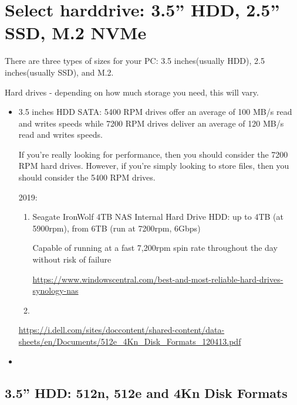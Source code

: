 \section{Select harddrive: 3.5'' HDD, 2.5'' SSD, M.2 NVMe}

There are three types of sizes for your PC: 3.5 inches(usually HDD), 2.5
inches(usually SSD), and M.2.

Hard drives - depending on how much storage you need, this will vary.
\begin{itemize}
  
  \item 3.5 inches HDD SATA: 5400 RPM drives offer an average of 100 MB/s read
  and writes speeds while 7200 RPM drives deliver an average of 120 MB/s read
  and writes speeds.
  
  If you’re really looking for performance, then you should consider the 7200
  RPM hard drives. However, if you’re simply looking to store files, then you
  should consider the 5400 RPM drives.


2019:
\begin{enumerate}
  \item Seagate IronWolf 4TB NAS Internal Hard Drive HDD: up to 4TB (at 5900rpm), from 6TB (run at 7200rpm, 6Gbps) 
  
  Capable of running at a fast 7,200rpm spin rate throughout the day without risk of failure 
  
  \url{https://www.windowscentral.com/best-and-most-reliable-hard-drives-synology-nas}
  
  \item  
\end{enumerate}


\url{https://i.dell.com/sites/doccontent/shared-content/data-sheets/en/Documents/512e_4Kn_Disk_Formats_120413.pdf}

  \item 
\end{itemize}


\subsection{3.5'' HDD: 512n, 512e and 4Kn Disk Formats}
\label{sec:disk-sector-format-512n}
\label{sec:disk-sector-format-512e}
\label{sec:disk-sector-format-4Kn}

